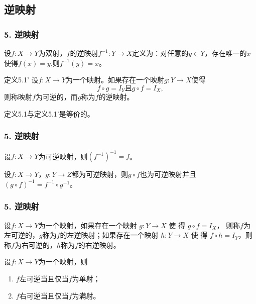 \documentclass{beamer}
\begin{document}
\begin{CJK*}{UTF8}{gbsn}
\section{逆映射}
\begin{frame}
  \frametitle{5. 逆映射}
  \begin{Def}
     设$f:X\to Y$为双射，$f$的\alert{逆映射}$f^{-1}:Y\to X$定义为：对任意的$y\in Y$，存在唯一的$x$使得$f(x)=y$,则$f^{-1}(y)=x$。
   \end{Def}
   \pause
     \begin{block}{定义5.1'}
     设$f:X\to Y$为一个映射。如果存在一个映射$g:Y\to X$使得\[f\circ g = I_{Y} \text{且} g\circ f = I_{X},\]则称映射$f$为可逆的，而$g$称为$f$的\alert{逆映射}。
   \end{block}
   \begin{Thm}
     定义5.1与定义5.1'是等价的。
   \end{Thm}
\end{frame}
\begin{frame}
  \frametitle{5. 逆映射}
  \begin{Thm}
    设$f:X\to Y$为可逆映射，则$(f^{-1})^{-1}=f$。
  \end{Thm}
  \pause
  \begin{Thm}
    设$f:X\to Y$，$g:Y\to Z$都为可逆映射，则$g\circ f$也为可逆映射并且$(g\circ f)^{-1} = f^{-1}\circ g^{-1}$。
  \end{Thm}
\end{frame}
\begin{frame}
  \frametitle{5. 逆映射}
  \begin{Def}\justifying\let\raggedright\justifying
    设$f:X\to Y$为一个映射，如果存在一个映射 $g:Y\to X$ 使 得 $g\circ f = I_X$，
    则称$f$为\alert{左可逆}的，$g$称为$f$的\alert{左逆映射}；如果存在一个映射
    $h:Y\to X$ 使 得 $f\circ h=I_Y$，则称$f$为\alert{右可逆}的，$h$称为$f$的\alert{右逆映射}。
  \end{Def}\pause
  \begin{Thm}
    设$f:X\to Y$为一个映射，则
    \begin{enumerate}
    \item $f$左可逆当且仅当$f$为单射；
    \item $f$右可逆当且仅当$f$为满射。
    \end{enumerate}
  \end{Thm}
\end{frame}

\end{CJK*}
\end{document}
